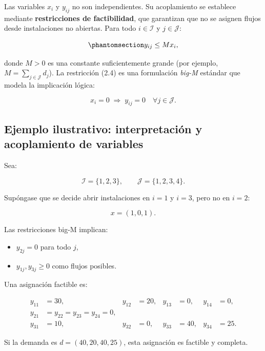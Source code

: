 \documentclass[
  spanish,
  us-letterpaper,
  DIV=11,
  numbers=noendperiod]{scrreprt}
\providecommand{\tightlist}{%
  \setlength{\itemsep}{0pt}\setlength{\parskip}{0pt}}
\numberwithin{equation}{section}
\begin{document}
Las variables \(x_i\) y \(y_{ij}\) no son independientes. Su
acoplamiento se establece mediante \textbf{restricciones de
factibilidad}, que garantizan que no se asignen flujos desde
instalaciones no abiertas. Para todo \(i \in \mathcal{I}\) y
\(j \in \mathcal{J}\):

\begin{equation}\phantomsection\label{eq-y_ij}{
y_{ij} \le M x_i,
}\end{equation}

donde \(M > 0\) es una constante suficientemente grande (por ejemplo,
\(M = \sum_{j \in \mathcal{J}} d_j\)). La restricción (2.4) es una
formulación \emph{big-M} estándar que modela la implicación lógica:

\[
x_i = 0 \;\Rightarrow\; y_{ij} = 0 \quad \forall j \in \mathcal{J}.
\]

\subsection{\texorpdfstring{\textbf{Ejemplo ilustrativo: interpretación
y acoplamiento de
variables}}{Ejemplo ilustrativo: interpretación y acoplamiento de variables}}\label{ejemplo-ilustrativo-interpretaciuxf3n-y-acoplamiento-de-variables}

Sea:

\[
\mathcal{I} = \{1,2,3\}, \qquad \mathcal{J} = \{1,2,3,4\}.
\]

Supóngase que se decide abrir instalaciones en \(i=1\) y \(i=3\), pero
no en \(i=2\):

\[
x = (1,0,1).
\]

Las restricciones big-M implican:

\begin{itemize}
\tightlist
\item
  \(y_{2j} = 0\) para todo \(j\),
\item
  \(y_{1j}, y_{3j} \ge 0\) como flujos posibles.
\end{itemize}

Una asignación factible es:

\[
\begin{aligned}
y_{11} &= 30, & y_{12} &= 20, & y_{13} &= 0, & y_{14} &= 0, \\
y_{21} &= y_{22} = y_{23} = y_{24} = 0, \\
y_{31} &= 10, & y_{32} &= 0, & y_{33} &= 40, & y_{34} &= 25.
\end{aligned}
\]

Si la demanda es \(d = (40,20,40,25)\), esta asignación es factible y
completa.
\end{document}
